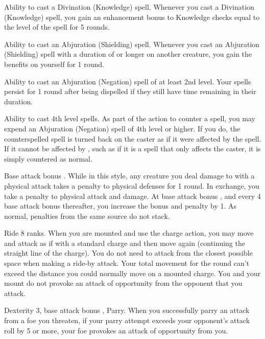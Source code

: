 \featpre Ability to cast a Divination (Knowledge) spell.
\featben Whenever you cast a Divination (Knowledge) spell, you gain an enhancement bonus to Knowledge checks equal to the level of the spell for 5 rounds.

\featpre Ability to cast an Abjuration (Shielding) spell.
\featben Whenever you cast an Abjuration (Shielding) spell with a duration of \durshort or longer on another creature, you gain the benefits on yourself for 1 round.

\featpre Ability to cast an Abjuration (Negation) spell of at least 2nd level.
\featben Your spells persist for 1 round after being dispelled if they still have time remaining in their duration.

 Ability to cast 4th level spells.
 As part of the action to counter a spell, you may expend an Abjuration (Negation) spell of 4th level or higher. If you do, the counterspelled spell is turned back on the caster as if it were affected by the  spell. If it cannot be affected by , such as if it is a spell that only affects the caster, it is simply countered as normal.

\featpre Base attack bonus .
 While in this style, any creature you deal damage to with a physical attack takes a  penalty to physical defenses for 1 round. In exchange, you take a  penalty to physical attack and damage. At base attack bonus , and every 4 base attack bonus thereafter, you increase the bonus and penalty by 1. As normal, penalties from the same source do not stack.

\featpre Ride 8 ranks.
 When you are mounted and use the charge action, you may move and attack as if with a standard charge and then move again (continuing the straight line of the charge). You do not need to attack from the closest possible space when making a ride-by attack. Your total movement for the round can't exceed the distance you could normally move on a mounted charge. You and your mount do not provoke an attack of opportunity from the opponent that you attack.

\featpre Dexterity 3, base attack bonus , Parry.
\featben When you successfully parry an attack from a foe you threaten, if your parry attempt exceeds your opponent's attack roll by 5 or more, your foe provokes an attack of opportunity from you.

